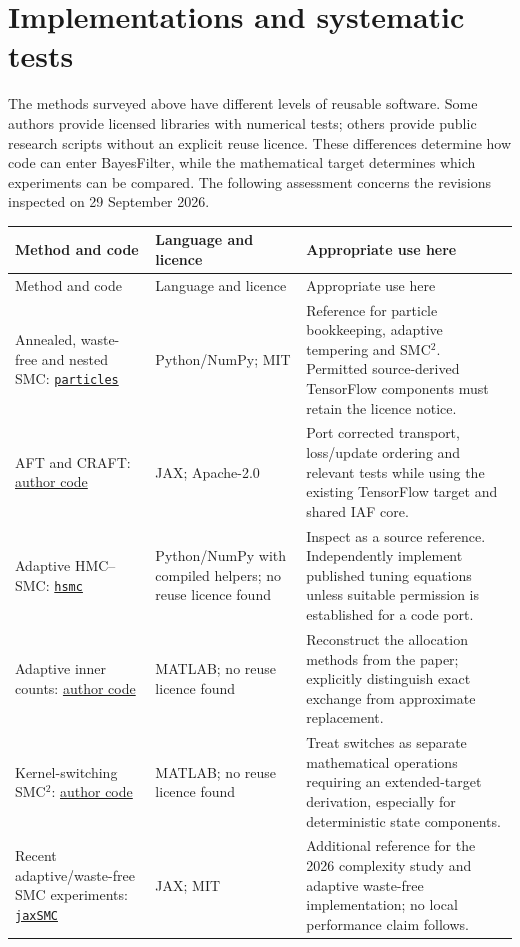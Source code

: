 \section{Implementations and systematic tests}
\label{sec:bf-is-smc-software}

The methods surveyed above have different levels of reusable software.
Some authors provide licensed libraries with numerical tests; others provide
public research scripts without an explicit reuse licence. These differences
determine how code can enter BayesFilter, while the mathematical target
determines which experiments can be compared. The following assessment
concerns the revisions inspected on 29 September 2026.

\begin{longtable}{>{\raggedright\arraybackslash}p{}
                  >{\raggedright\arraybackslash}p{}
                  >{\raggedright\arraybackslash}p{}}
\toprule
Method and code & Language and licence & Appropriate use here\\
\midrule
\endfirsthead
\toprule
Method and code & Language and licence & Appropriate use here\\
\midrule
\endhead
Annealed, waste-free and nested SMC:
\href{https://github.com/nchopin/particles}{\texttt{particles}}
& Python/NumPy; MIT
& Reference for particle bookkeeping, adaptive tempering and SMC$^2$.
Permitted source-derived TensorFlow components must retain the licence notice.\\[3pt]
AFT and CRAFT:
\href{https://github.com/google-deepmind/annealed_flow_transport}{author code}
& JAX; Apache-2.0
& Port corrected transport, loss/update ordering and relevant tests while
using the existing TensorFlow target and shared IAF core.\\[3pt]
Adaptive HMC--SMC:
\href{https://github.com/alexanderbuchholz/hsmc}{\texttt{hsmc}}
& Python/NumPy with compiled helpers; no reuse licence found
& Inspect as a source reference. Independently implement published tuning
equations unless suitable permission is established for a code port.\\[3pt]
Adaptive inner counts:
\href{https://github.com/imkebotha/adaptive-exact-approximate-smc}{author code}
& MATLAB; no reuse licence found
& Reconstruct the allocation methods from the paper; explicitly distinguish
exact exchange from approximate replacement.\\[3pt]
Kernel-switching SMC$^2$:
\href{https://github.com/imkebotha/kernel_switching_smc2}{author code}
& MATLAB; no reuse licence found
& Treat switches as separate mathematical operations requiring an
extended-target derivation, especially for deterministic state components.\\[3pt]
Recent adaptive/waste-free SMC experiments:
\href{https://github.com/ylefay/jaxSMC}{\texttt{jaxSMC}}
& JAX; MIT
& Additional reference for the 2026 complexity study and adaptive
waste-free implementation; no local performance claim follows.\\
\bottomrule
\end{longtable}

